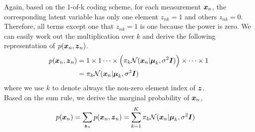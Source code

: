 \documentclass[11pt,a4paper]{article}
\newcommand{\htab}{\hspace*{0.63cm}}
\begin{document}
\htab Again, based on the 1-of-k coding scheme, for each measurement $\boldsymbol{x}_{n}$, the corresponding latent
    variable has only one element $z_{nk}=1$ and others $z_{nk}=0$. Therefore, all terms except one that
    $z_{nk} = 1$ is one because the power is zero.  
    We can easily work out the multiplication over $k$ and derive the following
    representation of $p(\boldsymbol{x}_{n}, \boldsymbol{z}_{n})$.
\begin{align}
    p(\xn, \zn) 
    &= 1 \time 1 \times 1 \cdots \times \Big(  \pk  \Nxn  \Big) \times \cdots \times 1 \\
     &=  \pk \Nxn  \label{7:jointprob}
    \end{align}
\htab where we use $k$ to denote always the non-zero element index of $\boldsymbol{z}$. \\
\htab Based on the sum rule, we derive the marginal probability of $\boldsymbol{x}_{n}$,
\begin{align}
    p(\boldsymbol{x}_{n}) = \sum_{\boldsymbol{z}_{n}} p(\boldsymbol{x}_{n}, \boldsymbol{z}_{n})
     &=  \sum_{k=1}^{K} \pi_{k} \mathcal{N}(\boldsymbol{x}_{n} | \boldsymbol{\mu}_{k}, \sigma^{2} \boldsymbol{I})  \label{7:univariateprob}
    \end{align}
\newpage
\end{document}
